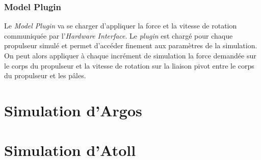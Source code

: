 			\subsubsection{Model Plugin}

				Le \textit{Model Plugin} va se charger d'appliquer la force et la vitesse de rotation communiquée par l'\textit{Hardware Interface}. Le \textit{plugin} est chargé pour chaque propulseur simulé et permet d'accéder finement aux paramètres de la simulation. On peut alors appliquer à chaque incrément de simulation la force demandée sur le corps du propulseur et la vitesse de rotation sur la liaison pivot entre le corps du propulseur et les pâles.
				

	\section{Simulation d'Argos}

	\section{Simulation d'Atoll}